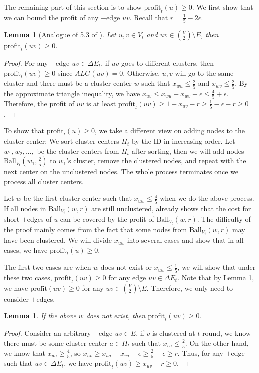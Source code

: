 \documentclass[11pt]{article}
\newtheorem{lemma}[theorem]{Lemma}
\newcommand{\ball}{\mathrm{Ball}}
\newcommand{\profit}{\mathrm{profit}}
\newcommand{\onefive}{\frac{1}{5}}
\newcommand{\twofive}{\frac{2}{5}}
\newcommand{\fourfive}{\frac{4}{5}}
\begin{document}
\begin{CJK*}{UTF8}{gbsn}
The remaining part of this section is to show $\profit_t(u) \geq 0$. We first show that we can bound the profit of any $-$edge $uv$. Recall that $r = \onefive - 2\epsilon$.

\begin{lemma}[Analogue of 5.3 of \cite{kalhan2019correlation}] 
\label{lem:roundingcostfornegativeedge}
 Let $u, v \in V_t$ and $uv \in {V \choose 2} \setminus E$, then $\profit_t(uv) \geq 0$.
\end{lemma}
\begin{proof}
For any $-$edge $uv \in \Delta E_t$, if $uv$ goes to different clusters, then $\profit_t(uv) \geq 0$ since $ALG(uv) = 0$. Otherwise, $u,v$ will go to the same cluster and there must be a cluster center $w$ such that $x_{wu} \leq \twofive$ and $x_{wv} \leq \twofive$. By the approximate triangle inequality, we have $x_{uv} \leq x_{wu} + x_{wv} + \epsilon \leq \fourfive + \epsilon$. Therefore, the profit of $uv$ is at least $\profit_t(uv) \geq 1 - x_{uv} -r \geq \onefive - \epsilon - r \geq 0$. 
\end{proof}


To show that $\profit_t(u) \geq 0$, we take a different view on adding nodes to the cluster center: We sort cluster centers $H_t$ by the ID in increasing order. Let $w_1, w_2, ...,$ be the cluster centers from $H_t$ after sorting, then we will add nodes $\ball_{V_t}(w_1, \twofive)$ to $w_1$'s cluster, remove the clustered nodes, and repeat with the next center on the unclustered nodes. The whole process terminates once we process all cluster centers. 

Let $w$ be the first cluster center such that $x_{uw} \leq \fourfive$ when we do the above process. If all nodes in $\ball_{V_t}(w, r)$ are still unclustered, \cite{kalhan2019correlation} already shows that the cost for short $+$edges of $u$ can be covered by the profit of $\ball_{V_t}(w, r)$. The difficulty of the proof mainly comes from the fact that some nodes from  $\ball_{V_t}(w, r)$ may have been clustered. We will divide $x_{uw}$ into several cases and show that in all cases, we have $\profit_t(u) \geq 0$.

The first two cases are when $w$ does not exist or $x_{uw} \leq \onefive$, we will show that under these two cases, $\profit_t(uv) \geq 0$ for any edge $uv \in \Delta E_t$. Note that by Lemma \ref{lem:roundingcostfornegativeedge}, we have $\profit(uv) \geq 0$ for any $uv \in {V \choose 2} \setminus E$. Therefore, we only need to consider $+$edges.

\begin{lemma}
\label{lem:firstcaseprofit}
If the above $w$ does not exist, then $\profit_t(uv) \geq 0$.
\end{lemma}
\begin{proof}
Consider an arbitrary $+$edge $uv \in E$, if $v$ is clustered at $t$-round, we know there must be some cluster center $a \in H_t$ such that $x_{va} \leq \twofive$. On the other hand, we know that $x_{ua} \geq \fourfive$, so $x_{uv} \geq x_{ua} - x_{va} - \epsilon \geq \twofive - \epsilon \geq r$. Thus, for any $+$edge such that $uv \in \Delta E_t$, we have $\profit_t(uv) \geq x_{uv} - r \geq 0$.
\end{proof}


\end{CJK*}
\end{document}
